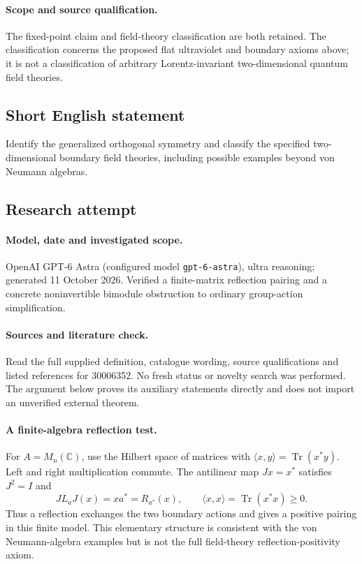\documentclass[11pt]{article}
\begin{document}
\paragraph{Scope and source qualification.}The fixed-point claim and field-theory classification are both retained. The classification concerns the proposed flat ultraviolet and boundary axioms above; it is not a classification of arbitrary Lorentz-invariant two-dimensional quantum field theories.
\subsection{Short English statement}
Identify the generalized orthogonal symmetry and classify the specified two-dimensional boundary field theories, including possible examples beyond von Neumann algebras.
\subsection{Research attempt}
\paragraph{Model, date and investigated scope.}
OpenAI GPT-6 Astra (configured model \texttt{gpt-6-astra}), ultra reasoning; generated 11 October 2026. Verified a finite-matrix reflection pairing and a concrete noninvertible bimodule obstruction to ordinary group-action simplification.

\paragraph{Sources and literature check.}
Read the full supplied definition, catalogue wording, source qualifications and listed references for 30006352. No fresh status or novelty search was performed. The argument below proves its auxiliary statements directly and does not import an unverified external theorem.

\paragraph{A finite-algebra reflection test.} For \(A=M_n(\mathbb C)\), use the Hilbert space of matrices with \(\langle x,y\rangle=\operatorname{Tr}(x^*y)\). Left and right multiplication commute. The antilinear map \(Jx=x^*\) satisfies \(J^2=I\) and
\[
 J L_a J(x)=xa^*=R_{a^*}(x),\qquad
 \langle x,x\rangle=\operatorname{Tr}(x^*x)\geq0.
\]
Thus a reflection exchanges the two boundary actions and gives a positive pairing in this finite model. This elementary structure is consistent with the von Neumann-algebra examples but is not the full field-theory reflection-positivity axiom.
\end{document}
